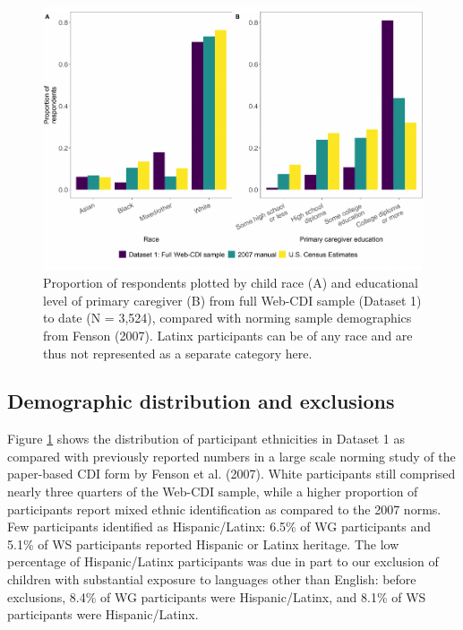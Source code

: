 \documentclass[
  english,
  ,man,floatsintext]{apa6}
\begin{document}
\begin{figure}
\centering
\includegraphics{webcdi_paper_files/figure-latex/demobarfig-1.pdf}
\caption{\label{fig:demobarfig}Proportion of respondents plotted by child race (A) and educational level of primary caregiver (B) from full Web-CDI sample (Dataset 1) to date (N = 3,524), compared with norming sample demographics from Fenson (2007). Latinx participants can be of any race and are thus not represented as a separate category here.}
\end{figure}

\hypertarget{demographic-distribution-and-exclusions}{%
\subsection{Demographic distribution and exclusions}\label{demographic-distribution-and-exclusions}}

Figure \ref{fig:demobarfig} shows the distribution of participant ethnicities in Dataset 1 as compared with previously reported numbers in a large scale norming study of the paper-based CDI form by Fenson et al. (2007). White participants still comprised nearly three quarters of the Web-CDI sample, while a higher proportion of participants report mixed ethnic identification as compared to the 2007 norms. Few participants identified as Hispanic/Latinx: 6.5\% of WG participants and 5.1\% of WS participants reported Hispanic or Latinx heritage. The low percentage of Hispanic/Latinx participants was due in part to our exclusion of children with substantial exposure to languages other than English: before exclusions, 8.4\% of WG participants were Hispanic/Latinx, and 8.1\% of WS participants were Hispanic/Latinx.
\end{document}
